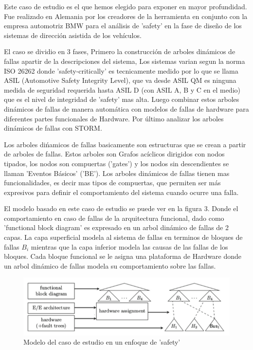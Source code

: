\documentclass[11pt]{article}
\begin{document}
Este caso de estudio es el que hemos elegido para exponer en mayor profundidad. Fue realizado en Alemania por los creadores de la herramienta en conjunto con la empresa automotriz BMW para el an\'alisis de 'safety' en la fase de dise\~no de los sistemas de direcci\'on asistida de los veh\'iculos.

El caso se dividio en 3 fases, Primero la construcci\'on de arboles din\'amicos de fallas apartir de la descripciones del sistema, Los sistemas varian segun la norma ISO 26262 donde 'safety-critically' es tecnicamente medido por lo que se llama ASIL (Automotive Safety Integrity Level), que va desde ASIL QM es ninguna medida de seguridad requerida hasta ASIL D (con ASIL A, B y C en el medio) que es el nivel de integridad de 'safety' mas alta. Luego combinar estos arboles din\'amicos de fallas de manera autom\'atica con modelos de fallas de hardware para diferentes partes funcionales de Hardware. Por \'ultimo  analizar los arboles din\'amicos de fallas con STORM.

Los arboles di\'namicos de fallas basicamente son estructuras que se crean a partir de arboles de fallas. Estos arboles son Grafos ac\'iclicos dirigidos con nodos tipados, los nodos son compuertas ('gates') y los nodos sin descendientes se llaman 'Eventos B\'asicos' ('BE'). Los arboles din\'amicos de fallas tienen mas funcionalidades, es decir mas tipos de compuertas, que permiten ser m\'as expresivos para definir el comportamiento del sistema cuando ocurre una falla.

El modelo basado en este caso de estudio se puede ver en la figura 3. Donde el comportamiento en caso de fallas de la arquitectura funcional, dado como 'functional block diagram' es expresado en un arbol din\'amico de fallas de 2 capas. La capa superficial modela al sistema de fallas en terminos de bloques de fallas $B_i$ mientras que la capa inferior modela las causas de las fallas de los bloques. Cada bloque funcional se le asigna una plataforma de Hardware donde un arbol din\'amico de fallas modela su comportamiento sobre las fallas.

\begin{figure}[h]
	\includegraphics[scale=0.43]{modelbased.png} 
	\centering
	\caption{Modelo del caso de estudio en un enfoque de 'safety'}%
\end{figure}
\end{document}
